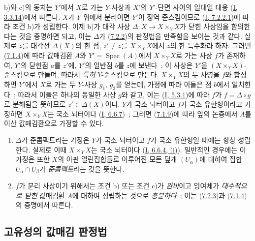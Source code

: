 b)와 c)의 동치는 $Y'$에서 $X$로 가는 $Y$-사상과 $X'$의
$Y'$-단면 사이의 일대일 대응
(\hyperref[I.3.3.14-ko]{I, 3.3.14})에서 따른다. $X$가 $Y$ 위에서 분리이면
$Y'$이 정역 준스킴이므로 (\hyperref[I.7.2.2.1-ko]{I, 7.2.2.1})에 따라 조건 b)가
성립한다. 이제 b)가 대각 사상
$\Delta:X\to X\times_YX$가 닫힌 사상임을 함의한다는 것을 증명하면 되고, 이는
$\Delta$가 (\hyperref[II.7.2.2-ko]{7.2.2})의 판정법을 만족함을 보이는 것과
같다. 실제로 $z$를 대각선 $\Delta(X)$의 한 점, $z'\neq z$를
$X\times_YX$에서 $z$의 한 특수화라 하자. 그러면
(\hyperref[II.7.1.4-ko]{7.1.4})에 따라 값매김환 $A$와
$Y'=\operatorname{Spec}(A)$에서 $X\times_YX$로 가는 사상 $f$가 존재하여,
$Y'$의 닫힌점 $a$를 $z'$에, $Y'$의 일반점 $b$를 $z$에 보낸다~; 이 사상은
$Y'$을 $(X\times_YX)$-준스킴으로 만들며, 따라서 \emph{특히} $Y$-준스킴으로
만든다. $X\times_YX$의 두 사영을 $f$와 합성하면 $Y'$에서 $X$로 가는
두 $Y$-사상 $g_1$, $g_2$를 얻는데, 가정에 따라 이들은 점 $b$에서
일치한다~; 따라서 이들은 하나의 동일한 사상 $g$와 같고, 이는
(\hyperref[I.5.3.1-ko]{I, 5.3.1})에 따라 $f$가 $f=\Delta\circ g$로
분해됨을 뜻하므로 $z'\in\Delta(X)$이다. $Y$가 국소 뇌터이고 $f$가
국소 유한형이라고 가정하면 $X\times_YX$는 국소 뇌터이다
(\hyperref[I.6.6.7-ko]{I, 6.6.7})~; 그러면
(\hyperref[II.7.1.9-ko]{7.1.9})에 따라 앞의 논증에서 $A$를
이산 값매김환으로 가정할 수 있다.

\begin{remark}[7.2.4]
\label{II.7.2.4-ko}
\begin{enumerate}
\item[\rm (i)] $\Delta$가 준콤팩트라는 가정은 $Y$가 국소 뇌터이고 $f$가
국소 유한형일 때에는 항상 성립한다. 실제로 이때 $X\times_YX$는 국소 뇌터이다
(\hyperref[I.6.6.4-ko]{I, 6.6.4, (i)}). 일반적인 경우에는 이 가정은 또한
$X$의 아핀 열린집합들로 이루어진 모든 덮개 $(U_\alpha)$에 대하여
집합 $U_\alpha\cap U_\beta$가 \emph{준콤팩트}라는 것을 뜻한다.
\item[\rm (ii)] $f$가 분리 사상이기 위해서는 조건 b) 또는 조건 c)가
\emph{완비}이고 잉여체가 \emph{대수적으로 닫힌} 값매김환 $A$에 대하여
성립하는 것으로 \emph{충분하다}~; 이는
(\hyperref[II.7.2.3-ko]{7.2.3})과
(\hyperref[II.7.1.4-ko]{7.1.4})의 증명에서 따른다.
\end{enumerate}
\end{remark}

\subsection{고유성의 값매김 판정법}
\label{subsection:II.7.3-ko}

